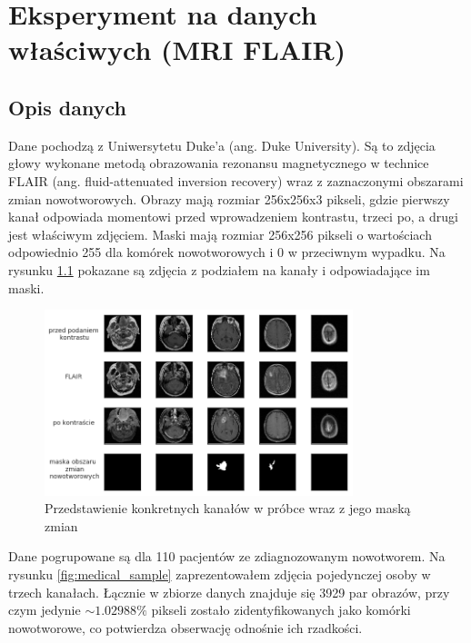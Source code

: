 \chapter{Eksperyment na danych właściwych (MRI FLAIR)}

\section{Opis danych}

Dane pochodzą z Uniwersytetu Duke'a (ang. Duke University). Są to zdjęcia głowy wykonane metodą obrazowania rezonansu magnetycznego w technice FLAIR (ang. fluid-attenuated inversion recovery) wraz z zaznaczonymi obszarami zmian nowotworowych. Obrazy mają rozmiar 256x256x3 pikseli, gdzie pierwszy kanał odpowiada momentowi przed wprowadzeniem kontrastu, trzeci po, a drugi jest właściwym zdjęciem. Maski mają rozmiar 256x256 pikseli o wartościach odpowiednio 255 dla komórek nowotworowych i 0 w przeciwnym wypadku. Na rysunku \ref{fig:medical_description} pokazane są zdjęcia z podziałem na kanały i odpowiadające im maski.

\begin{figure}[h!]
    \centering
    \includegraphics[width=0.8\textwidth]{images/medical_description}
    \caption{Przedstawienie konkretnych kanałów w próbce wraz z jego maską zmian}
    \label{fig:medical_description}
\end{figure}

Dane pogrupowane są dla 110 pacjentów ze zdiagnozowanym nowotworem. Na rysunku \ref{fig:medical_sample} zaprezentowałem zdjęcia pojedynczej osoby w trzech kanałach. Łącznie w zbiorze danych znajduje się 3929 par obrazów, przy czym jedynie $\sim1.02988\%$ pikseli zostało zidentyfikowanych jako komórki nowotworowe, co potwierdza obserwację odnośnie ich rzadkości.


